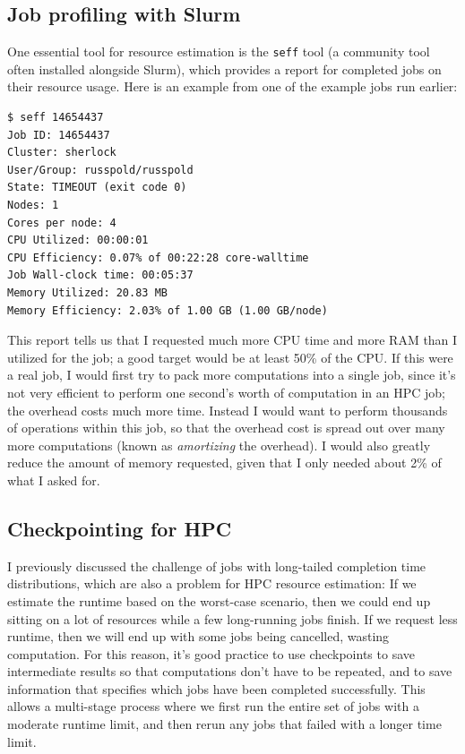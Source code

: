 \subsection{Job profiling with Slurm}

One essential tool for resource estimation is the \texttt{seff} tool (a community tool often installed alongside Slurm), which provides a report for completed jobs on their resource usage.  Here is an example from one of the example jobs run earlier:

\begin{lstlisting}[style=shell]
$ seff 14654437
Job ID: 14654437
Cluster: sherlock
User/Group: russpold/russpold
State: TIMEOUT (exit code 0)
Nodes: 1
Cores per node: 4
CPU Utilized: 00:00:01
CPU Efficiency: 0.07% of 00:22:28 core-walltime
Job Wall-clock time: 00:05:37
Memory Utilized: 20.83 MB
Memory Efficiency: 2.03% of 1.00 GB (1.00 GB/node)
\end{lstlisting}

This report tells us that I requested much more CPU time and more RAM than I utilized for the job; a good target would be at least 50\% of the CPU.  If this were a real job, I would first try to pack more computations into a single job, since it's not very efficient to perform one second's worth of computation in an HPC job; the overhead costs much more time. Instead I would want to perform thousands of operations within this job, so that the overhead cost is spread out over many more computations (known as \textit{amortizing} the overhead).  I would also greatly reduce the amount of memory requested, given that I only needed about 2\% of what I asked for.

\subsection{Checkpointing for HPC}

I previously discussed the challenge of jobs with long-tailed completion time distributions, which are also a problem for HPC resource estimation: If we estimate the runtime based on the worst-case scenario, then we could end up sitting on a lot of resources while a few long-running jobs finish.  If we request less runtime, then we will end up with some jobs being cancelled, wasting computation.  For this reason, it's good practice to use checkpoints to save intermediate results so that computations don't have to be repeated, and to save information that specifies which jobs have been completed successfully. This allows a multi-stage process where we first run the entire set of jobs with a moderate runtime limit, and then rerun any jobs that failed with a longer time limit.

